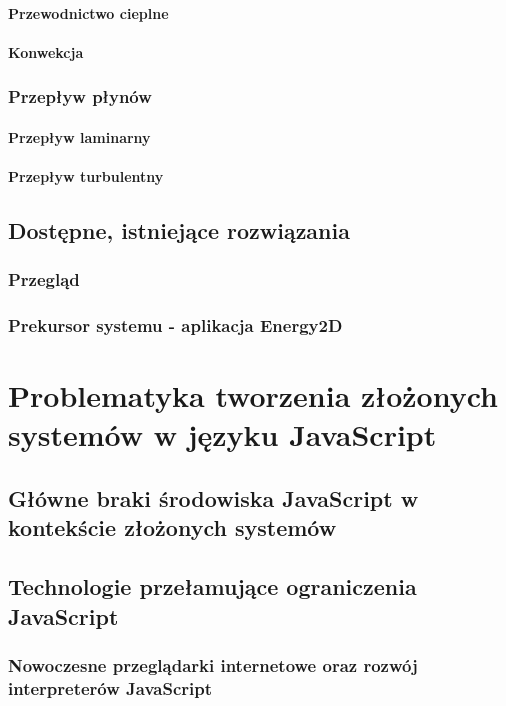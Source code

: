 \documentclass[pdflatex,11pt]{aghdpl}
\begin{document}
			\subsubsection{Przewodnictwo cieplne}
			\subsubsection{Konwekcja}
		\subsection{Przepływ płynów}
			\subsubsection{Przepływ laminarny}
			\subsubsection{Przepływ turbulentny}
	\section{Dostępne, istniejące rozwiązania}
		\subsection{Przegląd}
		\subsection{Prekursor systemu - aplikacja Energy2D}


\chapter{Problematyka tworzenia złożonych systemów w języku JavaScript}
	\section{Główne braki środowiska JavaScript w kontekście złożonych systemów}
	
	\section{Technologie przełamujące ograniczenia JavaScript}
		\subsection{Nowoczesne przeglądarki internetowe oraz rozwój interpreterów JavaScript}
\end{document}
